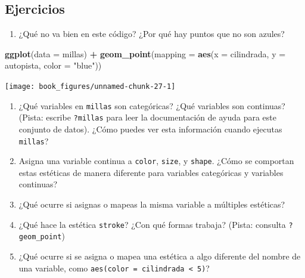 \documentclass[11pt,oneside]{report}
\newenvironment{Shaded}{\begin{snugshade}}{\end{snugshade}}
\newcommand{\DataTypeTok}[1]{\textcolor[rgb]{0.13,0.29,0.53}{#1}}
\newcommand{\KeywordTok}[1]{\textcolor[rgb]{0.13,0.29,0.53}{\textbf{#1}}}
\newcommand{\NormalTok}[1]{#1}
\newcommand{\OperatorTok}[1]{\textcolor[rgb]{0.81,0.36,0.00}{\textbf{#1}}}
\newcommand{\StringTok}[1]{\textcolor[rgb]{0.31,0.60,0.02}{#1}}
\providecommand{\tightlist}{%
  \setlength{\itemsep}{0pt}\setlength{\parskip}{0pt}}
\begin{document}
\hypertarget{ejercicios-1}{%
\subsection{Ejercicios}\label{ejercicios-1}}

\begin{enumerate}
\def\labelenumi{\arabic{enumi}.}
\tightlist
\item
  ¿Qué no va bien en este código? ¿Por qué hay puntos que no son azules?
\end{enumerate}

\begin{Shaded}
\begin{Highlighting}[]
 \KeywordTok{ggplot}\NormalTok{(}\DataTypeTok{data =}\NormalTok{ millas) }\OperatorTok{+}
\StringTok{   }\KeywordTok{geom_point}\NormalTok{(}\DataTypeTok{mapping =} \KeywordTok{aes}\NormalTok{(}\DataTypeTok{x =}\NormalTok{ cilindrada, }\DataTypeTok{y =}\NormalTok{ autopista, }\DataTypeTok{color =} \StringTok{"blue"}\NormalTok{))}
\end{Highlighting}
\end{Shaded}

\begin{center}\texttt{[image: book\_figures/unnamed-chunk-27-1]} \end{center}

\begin{enumerate}
\def\labelenumi{\arabic{enumi}.}
\setcounter{enumi}{1}
\item
  ¿Qué variables en \texttt{millas} son categóricas? ¿Qué variables son
  continuas? (Pista: escribe \texttt{?millas} para leer la documentación
  de ayuda para este conjunto de datos). ¿Cómo puedes ver esta
  información cuando ejecutas \texttt{millas}?
\item
  Asigna una variable continua a \texttt{color}, \texttt{size}, y
  \texttt{shape}. ¿Cómo se comportan estas estéticas de manera diferente
  para variables categóricas y variables continuas?
\item
  ¿Qué ocurre si asignas o mapeas la misma variable a múltiples
  estéticas?
\item
  ¿Qué hace la estética \texttt{stroke}? ¿Con qué formas trabaja?
  (Pista: consulta \texttt{?geom\_point})
\item
  ¿Qué ocurre si se asigna o mapea una estética a algo diferente del
  nombre de una variable, como
  \texttt{aes(color\ =\ cilindrada\ \textless{}\ 5)}?
\end{enumerate}
\end{document}
